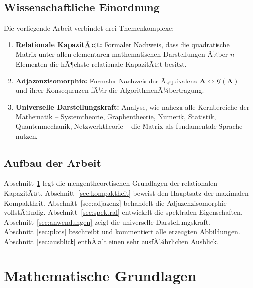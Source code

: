 ﻿\documentclass[12pt, a4paper]{article}
\theoremstyle{definition}
\theoremstyle{remark}
\newcommand{\vA}{\bm{A}}
\begin{document}
\subsection{Wissenschaftliche Einordnung}
\label{subsec:einordnung}

Die vorliegende Arbeit verbindet drei Themenkomplexe:

\begin{enumerate}[label=(\roman*)]
  \item \textbf{Relationale KapazitÃ¤t:} Formaler Nachweis, dass die quadratische
    Matrix unter allen elementaren mathematischen Darstellungen Ã¼ber $n$
    Elementen die hÃ¶chste relationale KapazitÃ¤t besitzt.

  \item \textbf{Adjazenzisomorphie:} Formaler Nachweis der Ã„quivalenz
    $\vA \leftrightarrow \mathcal{G}(\vA)$ und ihrer Konsequenzen fÃ¼r die
    AlgorithmenÃ¼bertragung.

  \item \textbf{Universelle Darstellungskraft:} Analyse, wie nahezu alle
    Kernbereiche der Mathematik -- Systemtheorie, Graphentheorie, Numerik,
    Statistik, Quantenmechanik, Netzwerktheorie -- die Matrix als
    fundamentale Sprache nutzen.
\end{enumerate}

\subsection{Aufbau der Arbeit}
\label{subsec:aufbau}

Abschnitt~\ref{sec:grundlagen} legt die mengentheoretischen Grundlagen der
relationalen KapazitÃ¤t. Abschnitt~\ref{sec:kompaktheit} beweist den
Hauptsatz der maximalen Kompaktheit. Abschnitt~\ref{sec:adjazenz} behandelt
die Adjazenzisomorphie vollstÃ¤ndig. Abschnitt~\ref{sec:spektral} entwickelt
die spektralen Eigenschaften. Abschnitt~\ref{sec:anwendungen} zeigt die
universelle Darstellungskraft. Abschnitt~\ref{sec:plots} beschreibt und
kommentiert alle erzeugten Abbildungen. Abschnitt~\ref{sec:ausblick} enthÃ¤lt
einen sehr ausfÃ¼hrlichen Ausblick.

\section{Mathematische Grundlagen}
\label{sec:grundlagen}
\end{document}
